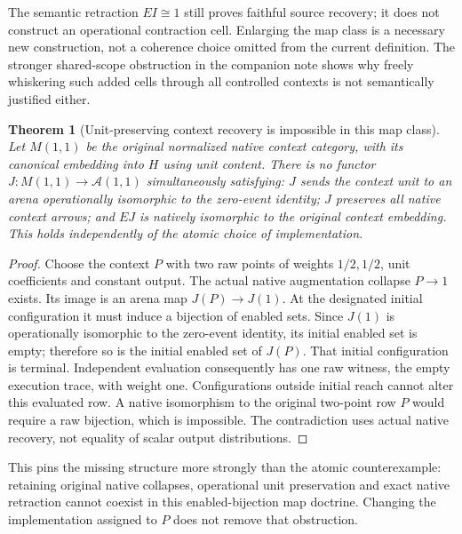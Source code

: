 \documentclass{article}
\newtheorem{theorem}{Theorem}
\begin{document}
The semantic retraction $EI\cong1$ still proves faithful source recovery;
it does not construct an operational contraction cell. Enlarging the map
class is a necessary new construction, not a coherence choice omitted from
the current definition. The stronger shared-scope obstruction in the
companion note shows why freely whiskering such added cells through all
controlled contexts is not semantically justified either.

\begin{theorem}[Unit-preserving context recovery is impossible in this map class]
Let $M(1,1)$ be the original normalized native context category, with its
canonical embedding into $H$ using unit content. There is no functor
$J:M(1,1)\to\mathcal A(1,1)$ simultaneously satisfying: $J$ sends the
context unit to an arena operationally isomorphic to the zero-event identity;
$J$ preserves all native context arrows; and $EJ$ is natively isomorphic to
the original context embedding. This holds independently of the atomic
choice of implementation.
\end{theorem}
\begin{proof}
Choose the context $P$ with two raw points of weights $1/2,1/2$, unit
coefficients and constant output. The actual native augmentation collapse
$P\to1$ exists. Its image is an arena map $J(P)\to J(1)$. At the designated
initial configuration it must induce a bijection of enabled sets. Since
$J(1)$ is operationally isomorphic to the zero-event identity, its initial
enabled set is empty; therefore so is the initial enabled set of $J(P)$.
That initial configuration is terminal. Independent evaluation consequently
has one raw witness, the empty execution trace, with weight one. Configurations
outside initial reach cannot alter this evaluated row. A native isomorphism
to the original two-point row $P$ would require a raw bijection, which is
impossible. The contradiction uses actual native recovery, not equality of
scalar output distributions.
\end{proof}
This pins the missing structure more strongly than the atomic counterexample:
retaining original native collapses, operational unit preservation and exact
native retraction cannot coexist in this enabled-bijection map doctrine.
Changing the implementation assigned to $P$ does not remove that obstruction.
\end{document}
